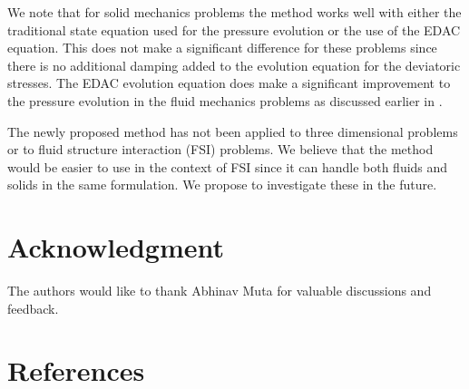 \documentclass[preprint,12pt]{elsarticle}
\begin{document}
We note that for solid mechanics problems the method works well with either
the traditional state equation used for the pressure evolution or the use of
the EDAC equation. This does not make a significant difference for these
problems since there is no additional damping added to the evolution equation
for the deviatoric stresses. The EDAC evolution equation does make a
significant improvement to the pressure evolution in the fluid mechanics
problems as discussed earlier in \cite{edac-sph:cf:2019}.

The newly proposed method has not been applied to three dimensional problems
or to fluid structure interaction (FSI) problems. We believe that the method
would be easier to use in the context of FSI since it can handle both fluids
and solids in the same formulation. We propose to investigate these in the
future.

\section*{Acknowledgment}

The authors would like to thank Abhinav Muta for valuable discussions and
feedback.

\section*{References}


\end{document}
